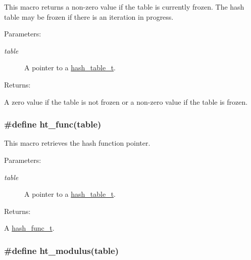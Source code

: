 This macro returns a non-zero value if the table is currently frozen. The hash table may be frozen if there is an iteration in progress.\begin{Desc}
\item[Parameters: ]\par
\begin{description}
\item[{\em 
table}]A pointer to a \hyperlink{group__dbprim__hash_a0}{hash\_\-table\_\-t}.\end{description}
\end{Desc}
\begin{Desc}
\item[Returns: ]\par
A zero value if the table is not frozen or a non-zero value if the table is frozen. \end{Desc}
\hypertarget{group__dbprim__hash_a24}{
\subsubsection[ht\_\-func]{\setlength{\rightskip}{0pt plus 5cm}\#define ht\_\-func(table)}}
\label{group__dbprim__hash_a24}


This macro retrieves the hash function pointer.\begin{Desc}
\item[Parameters: ]\par
\begin{description}
\item[{\em 
table}]A pointer to a \hyperlink{group__dbprim__hash_a0}{hash\_\-table\_\-t}.\end{description}
\end{Desc}
\begin{Desc}
\item[Returns: ]\par
A \hyperlink{group__dbprim__hash_a3}{hash\_\-func\_\-t}. \end{Desc}
\hypertarget{group__dbprim__hash_a22}{
\subsubsection[ht\_\-modulus]{\setlength{\rightskip}{0pt plus 5cm}\#define ht\_\-modulus(table)}}
\label{group__dbprim__hash_a22}


